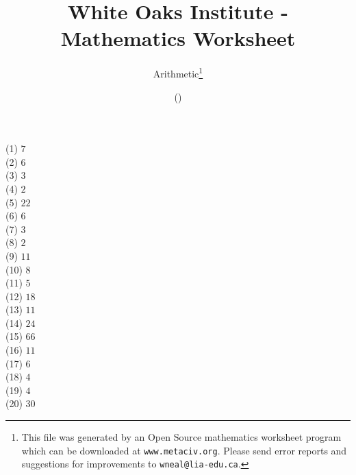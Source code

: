 \documentclass[letter]{article}
\begin{document}
\title{White Oaks Institute - Mathematics Worksheet}
\author{Arithmetic\thanks{This file was generated by an \textsf{Open Source} mathematics worksheet program which can be downloaded at \texttt{www.metaciv.org}. Please send error reports and suggestions for improvements to \texttt{wneal@lia-edu.ca}.}}
\date{\XCfileversion{} (\XCfiledate)}
\maketitle
\setlength{\parskip}{12mm plus 4mm minus 4mm}\setlength{\parindent}{0cm}\begin{multicols}{2}(1) $7$\\(2) $6$\\(3) $3$\\(4) $2$\\(5) $22$\\(6) $6$\\(7) $3$\\(8) $2$\\(9) $11$\\(10) $8$\\(11) $5$\\(12) $18$\\(13) $11$\\(14) $24$\\(15) $66$\\(16) $11$\\(17) $6$\\(18) $4$\\(19) $4$\\(20) $30$\\\end{multicols}
\end{document}
